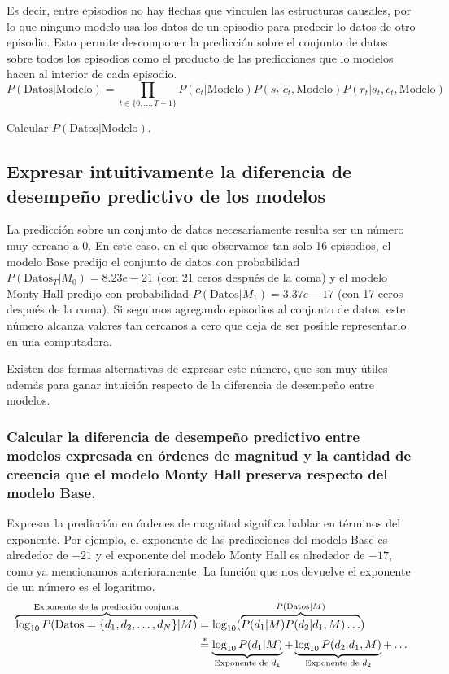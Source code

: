 \documentclass[a4paper,10pt]{article}
\begin{document}
Es decir, entre episodios no hay flechas que vinculen las estructuras causales, por lo que ninguno modelo usa los datos de un episodio para predecir lo datos de otro episodio.
Esto permite descomponer la predicción sobre el conjunto de datos sobre todos los episodios como el producto de las predicciones que lo modelos hacen al interior de cada episodio.
$$P(\text{Datos} |\text{Modelo}) = \prod_{t\in \{0,\dots,T-1 \}} P(c_t|\text{Modelo})P(s_t|c_t,\text{Modelo})P(r_t|s_t,c_t,\text{Modelo})  $$

Calcular $P(\text{Datos} |\text{Modelo})$.

\subsection{Expresar intuitivamente la diferencia de desempeño predictivo de los modelos}

La predicción sobre un conjunto de datos necesariamente resulta ser un número muy cercano a 0.
En este caso, en el que observamos tan solo 16 episodios, el modelo Base predijo el conjunto de datos con probabilidad $P(\text{Datos}_T|M_0) = 8.23e-21$ (con 21 ceros después de la coma) y el modelo Monty Hall predijo con probabilidad $P(\text{Datos}|M_1) = 3.37e-17$ (con 17 ceros después de la coma).
Si seguimos agregando episodios al conjunto de datos, este número alcanza valores tan cercanos a cero que deja de ser posible representarlo en una computadora.

Existen dos formas alternativas de expresar este número, que son muy útiles además para ganar intuición respecto de la diferencia de desempeño entre modelos.

\subsubsection{Calcular la diferencia de desempeño predictivo entre modelos expresada en órdenes de magnitud y la cantidad de creencia que el modelo Monty Hall preserva respecto del modelo Base.}

Expresar la predicción en órdenes de magnitud significa hablar en términos del exponente.
Por ejemplo, el exponente de las predicciones del modelo Base es alrededor de $-21$ y el exponente del modelo Monty Hall es alrededor de $-17$, como ya mencionamos anterioramente.
La función que nos devuelve el exponente de un número es el logaritmo.
\begin{align*}
\overbrace{\log_{10} P(\text{Datos} =\{d_1, d_2, \dots, d_N \}|M)}^{\text{\scriptsize Exponente de la predicción conjunta}} & = \log_{10} (\overbrace{P(d_1|M) P(d_2|d_1,M) \dots}^{P(\text{Datos}|M)}) \\
& \overset{*}{=}  \underbrace{\log_{10} P(d_1|M)}_{\text{Exponente de $d_1$}} + \underbrace{\log_{10} P(d_2|d_1,M) }_{\text{Exponente de $d_2$}} + \dots
\end{align*}
\end{document}
